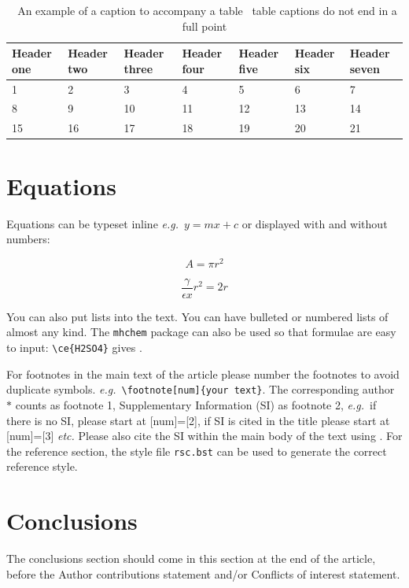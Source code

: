 \documentclass[twoside,twocolumn,9pt]{article}
\begin{document}
\begin{table}
\small
  \caption{\ An example of a caption to accompany a table \textendash\ table captions do not end in a full point}
  \label{tbl:example2}
  \begin{tabular*}{\textwidth}{@{\extracolsep{\fill}}lllllll}
    \hline
    Header one & Header two & Header three & Header four & Header five & Header six  & Header seven\\
    \hline
    1 & 2 & 3 & 4 & 5 & 6  & 7\\
    8 & 9 & 10 & 11 & 12 & 13 & 14 \\
    15 & 16 & 17 & 18 & 19 & 20 & 21\\
    \hline
  \end{tabular*}
\end{table}

\section{Equations}

Equations can be typeset inline \textit{e.g.}\ $ y = mx + c$ or displayed with and without numbers:

 \[ A = \pi r^2 \]

\begin{equation}
  \frac{\gamma}{\epsilon x} r^2 = 2r
\end{equation}

You can also put lists into the text. You can have bulleted or numbered lists of almost any kind. 
The \texttt{mhchem} package can also be used so that formulae are easy to input: \texttt{\textbackslash ce\{H2SO4\}} gives . 

For footnotes in the main text of the article please number the footnotes to avoid duplicate symbols. \textit{e.g.}\ \texttt{\textbackslash footnote[num]\{your text\}}. The corresponding author $\ast$ counts as footnote 1, Supplementary Information (SI) as footnote 2, \textit{e.g.}\ if there is no SI, please start at [num]=[2], if SI is cited in the title please start at [num]=[3] \textit{etc.} Please also cite the SI within the main body of the text using \dag. For the reference section, the style file \texttt{rsc.bst} can be used to generate the correct reference style.

\section*{Conclusions}
The conclusions section should come in this section at the end of the article, before the Author contributions statement and/or Conflicts of interest statement.
\end{document}
